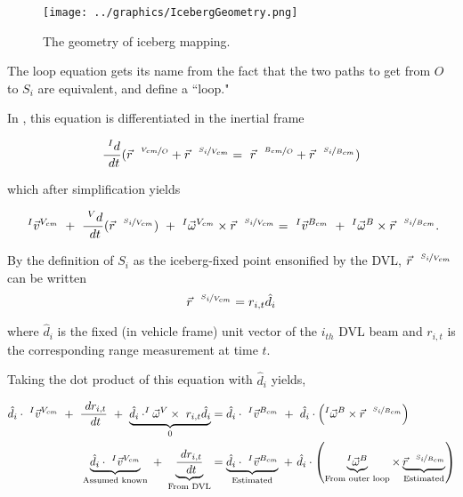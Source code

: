 \begin{figure}[htbp]
   \centering
   \texttt{[image: ../graphics/IcebergGeometry.png]} %
   \caption{The geometry of iceberg mapping. }  
    \label{fig:LoopEquation}
\end{figure}

The loop equation gets its name from the fact that the two paths to get from $O$ to $S_i$ are equivalent, and define a ``loop."

In \cite{Kimball2011b}, this equation is differentiated in the inertial frame

\begin{equation} %
   \frac{~^Id}{~dt}(\vec{r}^{~~\nicefrac{V_{cm}}{O}} + \vec{r}^{~~\nicefrac{S_i}{V_{cm}}} = ~ \vec{r}^{~~\nicefrac{B_{cm}}{O}} + \vec{r}^{~~\nicefrac{S_i}{B_{cm}}})\\
   \end{equation}
   
   which after simplification yields 
   
       \begin{equation}
    ~^{I}\vec{v}^{V_{cm}} ~+~ \frac{~^Vd}{~dt}(\vec{r}^{~~\nicefrac{S_i}{V_{cm}}} ) ~+~ ^{I}\vec{\omega}^{V_{cm}}\times\vec{r}^{~~\nicefrac{S_i}{V_{cm}}}  = 
    ~^{I}\vec{v}^{B_{cm}} ~+~^{I}\vec{\omega}^{B}\times\vec{r}^{~~\nicefrac{S_i}{B_{cm}}}. \\
\end{equation}

By the definition of $S_i$ as the iceberg-fixed point ensonified by the DVL,  $\vec{r}^{~~\nicefrac{S_i}{V_{cm}}}$ can be written 
\begin{equation}
\vec{r}^{~~\nicefrac{S_i}{V_{cm}}}= r_{i,t}\hat{d}_{i}  
\label{eqn:SiDef}
\end{equation}

where $\hat{d}_{i} $ is the fixed (in vehicle frame) unit vector of the $i_{th}$ DVL beam and $r_{i,t} $ is the corresponding range measurement at time $t$.  

Taking the dot product of this equation with $\hat{d}_{i} $ yields,

    \begin{align}
    \hat{d}_{i} \cdot~^{I}\vec{v}^{V_{cm}} ~+~ \frac{~dr_{i,t}}{~dt}  ~+~ \underbrace{\hat{d}_{i} \cdot^{I}\vec{\omega}^{V}\times{~r_{i,t}\hat{d}_{i}}}_{0}  &=
     \label{eqn:expensive}
    \hat{d}_{i} \cdot~^{I}\vec{v}^{B_{cm}} ~ + ~\hat{d}_{i} \cdot\left(^{I}\vec{\omega}^{B}\times\vec{r}^{~~\nicefrac{S_i}{B_{cm}}}\right)  \\
    \underbrace{\hat{d}_{i} \cdot~^{I}\vec{v}^{V_{cm}}}_{\text{Assumed known}} ~+~ \underbrace{\frac{~dr_{i,t}}{~dt} }_{\text{From DVL}}  &=
    \underbrace{\hat{d}_{i} \cdot~^{I}\vec{v}^{B_{cm}}}_{\text{Estimated}} ~ + ~\hat{d}_{i} \cdot\left(\underbrace{^{I}\vec{\omega}^{B}}_{\text{From outer loop}}\times\underbrace{\vec{r}^{~~\nicefrac{S_i}{B_{cm}}}}_{\text{Estimated}}\right)  
         \label{eqn:expensive2}
\end{align}

